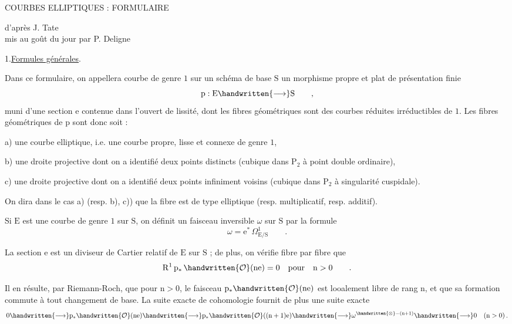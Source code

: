 \begin{center}
COURBES ELLIPTIQUES : FORMULAIRE

d'après J. Tate\\
mis au goût du jour par P. Deligne
\end{center}

1.\qquad \uline{Formules générales}.

Dans ce formulaire, on appellera courbe de genre $1$ sur un schéma de base $\mathrm{S}$ un morphisme propre et plat de présentation finie
\[
\mathrm{p}:\mathrm{E}\handwritten{\longrightarrow}\mathrm{S}\qquad,
\]
muni d'une section $\mathrm{e}$ contenue dans l'ouvert de lissité, dont les fibres géométriques sont des courbes réduites irréductibles de \reversemarginpar{}\normalmarginpar $1$. Les fibres géométriques de $\mathrm{p}$ sont donc soit :

a) une courbe elliptique, i.e. une courbe propre, lisse et connexe de genre $1$,

b) une droite projective dont on a identifié deux points distincts (cubique dans $\mathrm{P}_{2}$ à point double ordinaire),

c) une droite projective dont on a identifié deux points infiniment voisins (cubique dans $\mathrm{P}_{2}$ à singularité cuspidale).

On dira dans le cas a) (resp. b), c)) que la fibre est de type elliptique (resp. multiplicatif, resp. additif).

Si $\mathrm{E}$ est une courbe de genre $1$ sur $\mathrm{S}$, on définit un faisceau inversible $\omega$ sur $\mathrm{S}$ par la formule
\[
\omega=\mathrm{e}^{*}\,\Omega^{1}_{\mathrm{E}/\mathrm{S}}\qquad.
\]

La section $\mathrm{e}$ est un diviseur de Cartier relatif de $\mathrm{E}$ sur $\mathrm{S}$ ;
\clearpage
de plus, on vérifie fibre par fibre que
\[
\mathrm{R}^{1}\,\mathrm{p}_{*}\,\handwritten{\mathcal{O}}(\mathrm{ne})=0\quad\text{pour}\quad\mathrm{n}>0\qquad.
\]

Il en résulte, par Riemann-Roch, que pour $\mathrm{n}>0$, le faisceau $\mathrm{p}_{*}\handwritten{\mathcal{O}}(\mathrm{ne})$ est looalement libre de rang $\mathrm{n}$, et que sa formation commute à tout changement de base. La suite exacte de cohomologie fournit de plus une suite exacte
\[
0\handwritten{\longrightarrow}\mathrm{p}_{*}\handwritten{\mathcal{O}}(\mathrm{ne})
\handwritten{\longrightarrow}\mathrm{p}_{*}\handwritten{\mathcal{O}}((\mathrm{n}+1)\mathrm{e})
\handwritten{\longrightarrow}\omega^{\handwritten{\otimes}-(\mathrm{n}+1)}
\handwritten{\longrightarrow}0\quad(\mathrm{n}>0)\,.
\]

